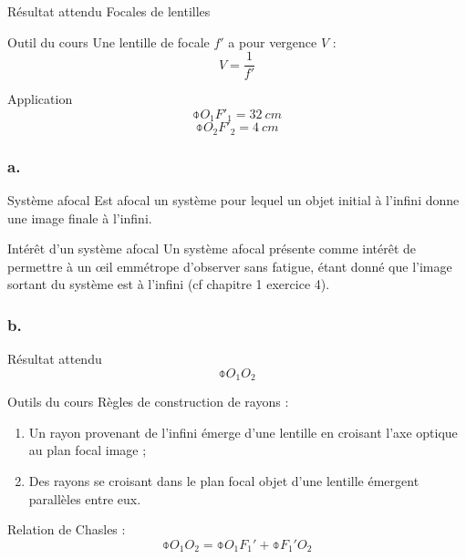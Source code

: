 \documentclass[10pt,a5paper,notitlepage]{book}
\begin{document}
\begin{NCprop}{Résultat attendu}
    Focales de lentilles
\end{NCprop}

\begin{NCdemo}{Outil du cours}
    Une lentille de focale $f'$ a pour vergence $V$ :
    \[ V = \frac{1}{f'} \]
\end{NCdemo}

\begin{NCexem}{Application}
    \[ \boxed{\obar{O_1F'_1} = \SI{32}{cm}} \]
    \[ \boxed{\obar{O_2F'_2} = \SI{4}{cm}} \]
\end{NCexem}

\subsubsection{a.}
\begin{defi}{Système afocal}
    Est afocal un système pour lequel un objet initial à l'infini donne une
    image finale à l'infini.
\end{defi}

\begin{inte}{Intérêt d'un système afocal}
    Un système afocal présente comme intérêt de permettre à un œil emmétrope
    d'observer sans fatigue, étant donné que l'image sortant du système est à
    l'infini (cf chapitre 1 exercice 4).
\end{inte}

\setcounter{subsubsection}{1}
\subsubsection{b.}
\begin{NCprop}{Résultat attendu}
    $$\obar{O_1O_2}$$
\end{NCprop}

\begin{NCdemo}{Outils du cours}
    Règles de construction de rayons :
    \begin{enumerate}

        \item Un rayon provenant de l'infini émerge d'une lentille en croisant
            l'axe optique au plan focal image ;

        \item Des rayons se croisant dans le plan focal objet d'une lentille
            émergent parallèles entre eux.
    \end{enumerate}
    Relation de Chasles :
    \[ \obar{O_1O_2} = \obar{O_1F_1'} + \obar{F_1'O_2} \]
\end{NCdemo}
\end{document}
